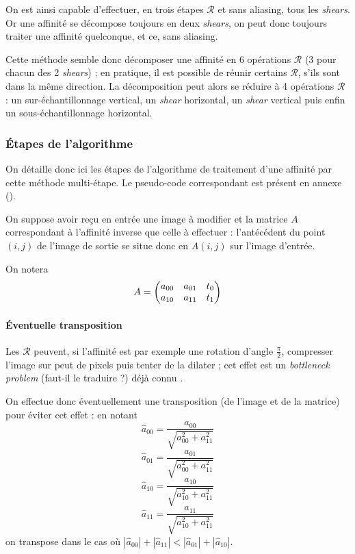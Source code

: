 	On est ainsi capable d'effectuer, en trois étapes $\mathcal R$ et sans aliasing, tous les \emph{shears}. Or une affinité se décompose toujours en deux \emph{shears}, on peut donc toujours traiter une affinité quelconque, et ce, sans aliasing.
	
	Cette méthode semble donc décomposer une affinité en 6 opérations $\mathcal R$ (3 pour chacun des 2 \emph{shears}) ; en pratique, il est possible de réunir certains $\mathcal R$, s'ils sont dans la même direction. La décomposition peut alors se réduire à 4 opérations $\mathcal R$ : un sur-échantillonnage vertical, un \emph{shear} horizontal, un \emph{shear} vertical puis enfin un sous-échantillonnage horizontal.
	
\subsubsection{Étapes de l'algorithme}
	On détaille donc ici les étapes de l'algorithme de traitement d'une affinité par cette méthode multi-étape. Le pseudo-code correspondant est présent en annexe ().
	
	On suppose avoir reçu en entrée une image à modifier et la matrice $A$ correspondant à l'affinité inverse que celle à effectuer : l'antécédent du point $(i,j)$ de l'image de sortie se situe donc en $A(i,j)$ sur l'image d'entrée.
	
	On notera
	\[A = \begin{pmatrix} a_{00} & a_{01} & t_0\\ a_{10} & a_{11} & t_1 \end{pmatrix}\]
	
	\paragraph{Éventuelle transposition}
		
		Les $\mathcal R$ peuvent, si l'affinité est par exemple une rotation d'angle $\frac{\pi}{2}$, compresser l'image sur peut de pixels puis tenter de la dilater ; cet effet est un \emph{bottleneck problem} (faut-il le traduire  ?) déjà connu \cite{wolberg1990digital}.
		
		On effectue donc éventuellement une transposition (de l'image et de la matrice) pour éviter cet effet : en notant
		\[\hat a_{00} = \frac{a_{00}}{\sqrt{a_{00}^2+a_{11}^2}}\]
		\[\hat a_{01} = \frac{a_{01}}{\sqrt{a_{00}^2+a_{11}^2}}\]
		\[\hat a_{10} = \frac{a_{10}}{\sqrt{a_{10}^2+a_{11}^2}}\]
		\[\hat a_{11} = \frac{a_{11}}{\sqrt{a_{10}^2+a_{11}^2}}\]
		on transpose dans le cas où $|\hat a_{00}|+|\hat a_{11}|<|\hat a_{01}|+|\hat a_{10}|$.
		
